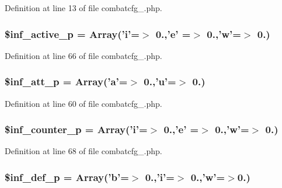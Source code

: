Definition at line 13 of file combatcfg\+\_.\+php.

\hypertarget{combatcfg__1_8php_a393d73e9a6ca563f564d042637767a7f}{
\subsubsection[{\$inf\+\_\+active\+\_\+p}]{\setlength{\rightskip}{0pt plus 5cm}\$inf\+\_\+active\+\_\+p = Array('i'=$>$ 0.,'e' =$>$ 0.,'w'=$>$ 0.)}}\label{combatcfg__1_8php_a393d73e9a6ca563f564d042637767a7f}


Definition at line 66 of file combatcfg\+\_.\+php.

\hypertarget{combatcfg__1_8php_a97dc28fdb2fa0a86e0fe7d50cf172f2d}{
\subsubsection[{\$inf\+\_\+att\+\_\+p}]{\setlength{\rightskip}{0pt plus 5cm}\$inf\+\_\+att\+\_\+p = Array('a'=$>$ 0.,'u'=$>$ 0.)}}\label{combatcfg__1_8php_a97dc28fdb2fa0a86e0fe7d50cf172f2d}


Definition at line 60 of file combatcfg\+\_.\+php.

\hypertarget{combatcfg__1_8php_a80479ba7a8968afdd20f8b71990de73c}{
\subsubsection[{\$inf\+\_\+counter\+\_\+p}]{\setlength{\rightskip}{0pt plus 5cm}\$inf\+\_\+counter\+\_\+p = Array('i'=$>$ 0.,'e' =$>$ 0.,'w'=$>$ 0.)}}\label{combatcfg__1_8php_a80479ba7a8968afdd20f8b71990de73c}


Definition at line 68 of file combatcfg\+\_.\+php.

\hypertarget{combatcfg__1_8php_a3475395c844150e292d03a69619f78bc}{
\subsubsection[{\$inf\+\_\+def\+\_\+p}]{\setlength{\rightskip}{0pt plus 5cm}\$inf\+\_\+def\+\_\+p = Array('b'=$>$ 0.,'i'=$>$ 0.,'w'=$>$0.)}}\label{combatcfg__1_8php_a3475395c844150e292d03a69619f78bc}


